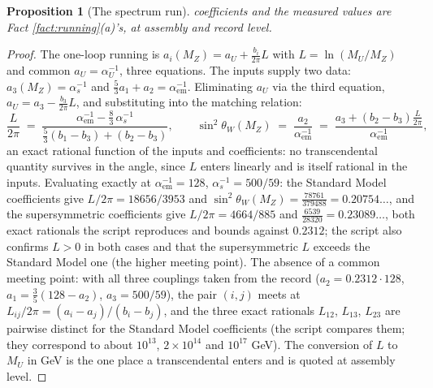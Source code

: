 \documentclass[11pt]{article}
\newtheorem{proposition}[theorem]{Proposition}
\theoremstyle{definition}
\begin{document}
\begin{proposition}[The spectrum run]
coefficients and the measured values are Fact \ref{fact:running}(a)'s, at assembly and record level.
\end{proposition}

\begin{proof}
The one-loop running is $a_{i}(M_{Z}) = a_{U} + \tfrac{b_{i}}{2\pi} L$ with $L = \ln(M_{U}/M_{Z})$ and common $a_{U} = \alpha_{U}^{-1}$, three equations. The inputs supply two data: $a_{3}(M_{Z}) = \alpha_{s}^{-1}$ and $\tfrac53 a_{1} + a_{2} = \alpha_{\mathrm{em}}^{-1}$. Eliminating $a_{U}$ via the third equation, $a_{U} = a_{3} - \tfrac{b_{3}}{2\pi}L$, and substituting into the matching relation:
\[
\frac{L}{2\pi} \;=\; \frac{\alpha_{\mathrm{em}}^{-1} - \tfrac83\, \alpha_{s}^{-1}}{\tfrac53(b_{1} - b_{3}) + (b_{2} - b_{3})},
\qquad
\sin^{2}\theta_{W}(M_{Z}) \;=\; \frac{a_{2}}{\alpha_{\mathrm{em}}^{-1}} \;=\; \frac{a_{3} + (b_{2} - b_{3})\tfrac{L}{2\pi}}{\alpha_{\mathrm{em}}^{-1}},
\]
an exact rational function of the inputs and coefficients: no transcendental quantity survives in the angle, since $L$ enters linearly and is itself rational in the inputs. Evaluating exactly at $\alpha_{\mathrm{em}}^{-1} = 128$, $\alpha_{s}^{-1} = 500/59$: the Standard Model coefficients give $L/2\pi = 18656/3953$ and $\sin^{2}\theta_{W}(M_{Z}) = \tfrac{78761}{379488} = 0.20754\ldots$, and the supersymmetric coefficients give $L/2\pi = 4664/885$ and $\tfrac{6539}{28320} = 0.23089\ldots$, both exact rationals the script reproduces and bounds against $0.2312$; the script also confirms $L > 0$ in both cases and that the supersymmetric $L$ exceeds the Standard Model one (the higher meeting point). The absence of a common meeting point: with all three couplings taken from the record ($a_{2} = 0.2312 \cdot 128$, $a_{1} = \tfrac35(128 - a_{2})$, $a_{3} = 500/59$), the pair $(i, j)$ meets at $L_{ij}/2\pi = (a_{i} - a_{j})/(b_{i} - b_{j})$, and the three exact rationals $L_{12}$, $L_{13}$, $L_{23}$ are pairwise distinct for the Standard Model coefficients (the script compares them; they correspond to about $10^{13}$, $2 \times 10^{14}$ and $10^{17}$ GeV). The conversion of $L$ to $M_{U}$ in GeV is the one place a transcendental enters and is quoted at assembly level.
\end{proof}
\end{document}
